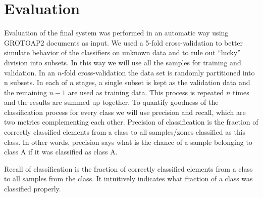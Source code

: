\chapter{Evaluation}\label{chapter:evaluation}
Evaluation of the final system was performed in an automatic way using GROTOAP2 documents as input. We used a 5-fold cross-validation to better simulate behavior of the classifiers on unknown data and to rule out ``lucky'' division into subsets. In this way we will use all the samples for training and validation. In an $n$-fold cross-validation the data set is randomly partitioned into n subsets. In each of $n$ stages, a single subset is kept as the validation data and the remaining $n-1$ are used as training data. This process is repeated $n$ times and the results are summed up together.
To quantify goodness of the classification process for every class we will use precision and recall, which are two metrics complementing each other. Precision of classification is the fraction of correctly classified elements from a class to all samples/zones classified as this class. In other words, precision says what is the chance of a sample belonging to class A if it was classified as class A.

Recall of classification is the fraction of correctly classified elements from a class to all samples from the class. It intuitively indicates what fraction of a class was classified properly. 


